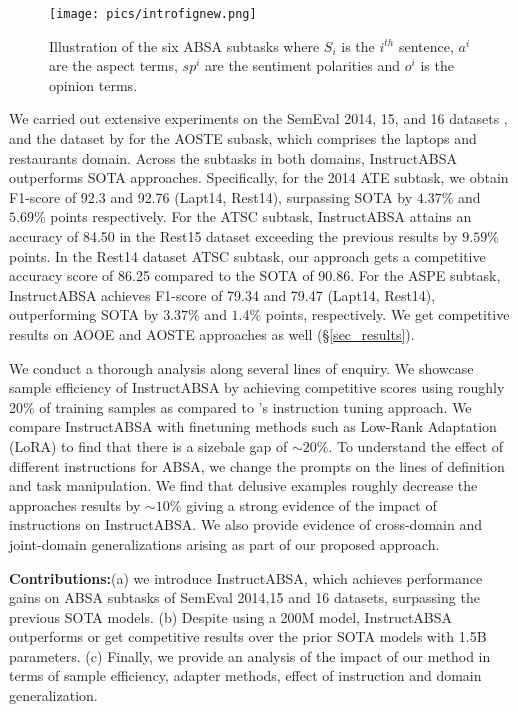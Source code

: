 \documentclass[11pt]{article}
\newcommand{\name}{\textsc{I}nstruct\textsc{ABSA}\xspace}
\begin{document}
\begin{figure}[t!]
	\centering
	\texttt{[image: pics/introfignew.png]}
	\caption{Illustration of the six ABSA subtasks where $S_i$ is the $i^{th}$ sentence, $a^i$ are the aspect terms, $sp^i$ are the sentiment polarities and $o^i$ is the opinion terms.}
	\label{fig:teaser}
\end{figure} 



 We carried out extensive experiments on the SemEval 2014, 15, and 16 datasets \cite{pontiki-etal-2014-semeval,Pontiki2015SemEval2015T1,Pontiki2016SemEval2016T5}, and the dataset by \cite{Peng_Xu_Bing_Huang_Lu_Si_2020} for the AOSTE subask, which comprises the laptops and restaurants domain. 
 Across the subtasks in both domains, \name{} outperforms SOTA approaches. 
Specifically, for the 2014 ATE subtask, we obtain F1-score of 92.3 and 92.76 (Lapt14, Rest14), surpassing SOTA by $4.37\%$ and $5.69\%$ points respectively.
For the ATSC subtask, \name{} attains an accuracy of 84.50 in the Rest15 dataset exceeding the previous results by $9.59\%$ points. 
In the Rest14 dataset ATSC subtask, our approach gets a competitive accuracy score of 86.25 compared to the SOTA of 90.86.
For the ASPE subtask, \name{} achieves F1-score of 79.34 and 79.47 (Lapt14, Rest14), outperforming SOTA by $3.37\%$ and $1.4\%$ points, respectively.
We get competitive results on AOOE and AOSTE approaches as well (\S \ref{sec_results}). 

We conduct a thorough analysis along several lines of enquiry. 
We showcase sample efficiency of \name{} by achieving competitive scores using roughly 20\% of training samples as compared to \citet{varia2023instruction}'s instruction tuning approach.
We compare \name{} with finetuning methods such as Low-Rank Adaptation (LoRA) \cite{hu2021lora} to find that there is a sizebale gap of $\sim20\%$.
To understand the effect of different instructions for ABSA, we change the prompts on the lines of definition and task manipulation. 
We find that delusive examples roughly decrease the approaches results by $\sim10\%$ giving a strong evidence of the impact of instructions on \name{}.
We also provide evidence of cross-domain and joint-domain generalizations arising as part of our proposed approach. 

\noindent\textbf{Contributions:}(a) we introduce \name{}, which achieves performance gains on ABSA subtasks of SemEval 2014,15 and 16 datasets, surpassing the previous SOTA models. 
(b) Despite using a 200M model, \name{} outperforms or get competitive results over the prior SOTA models with 1.5B parameters. 
(c) Finally, we provide an analysis of the impact of our method in terms of sample efficiency, adapter methods, effect of instruction and domain generalization.
\end{document}
